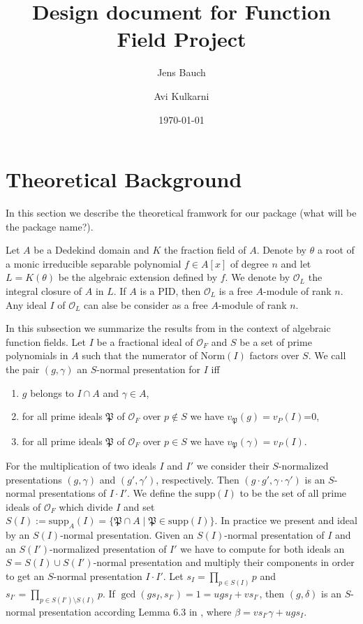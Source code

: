 \documentclass{amsart}
\title{Design document for Function Field Project}
\author{Jens Bauch}
\author{Avi Kulkarni}
\date{\today}
\theoremstyle{definition}
\def\P{\mathfrak{P}}
\def\su{\mathrm{supp}}
\def\oo{\mathcal{O}}
\def\NM{\mathrm{Norm}}
\begin{document}
	
\maketitle

\section{Theoretical Background}

In this section we describe the theoretical framwork for our package (what will be the package name?). 

Let $A$ be a Dedekind domain and $K$ the fraction field of $A$. Denote by $\theta$ a root of a monic irreducible separable polynomial $f\in A[x]$ of degree $n$ and let $L=K(\theta)$ be the algebraic extension defined by $f$. We denote by $\oo_L$ the integral closure of $A$ in $L$. If $A$ is a PID, then $\oo_L$ is a free $A$-module of rank $n$. Any ideal $I$ of $\oo_L$ can alse be consider as a free $A$-module of rank $n$.

In this subsection we summarize the results from \cite{Fieker} in the context of algebraic function fields. Let $I$ be a fractional ideal of $\oo_F$ and $S$ be a set of prime polynomials in $A$ such that the numerator of $\NM(I)$ factors over $S$. We call the pair $(g,\gamma)$ an $S$-normal presentation for $I$ iff
\begin{enumerate}
\item $g$ belongs to $I\cap A$ and $\gamma\in A$,
\item  for all prime ideals $\P$ of $\oo_F$ over $p\notin S$ we have $v_\P(g)=v_P(I)$=0,
\item  for all prime ideals $\P$ of $\oo_F$ over $p\in S$ we have $v_\P(\gamma)=v_P(I)$.
\end{enumerate}

For the multiplication of two ideals $I$ and $I'$ we consider their $S$-normalized presentations $(g,\gamma)$ and $(g',\gamma')$, respectively. Then $(g\cdot g',\gamma\cdot \gamma')$ is an $S$-normal presentations of $I\cdot I'$. We define the $\su(I)$ to be the set of all prime ideals of $\oo_F$ which divide $I$ and set $S(I):=\su_A(I) =\{\P\cap A\mid\P\in\su(I)\}$. In practice we present and ideal by an $S(I)$-normal presentation. Given an $S(I)$-normal presentation of $I$ and an $S(I')$-normalized presentation of $I'$ we have to compute for both ideals an $S=S(I)\cup S(I')$-normal presentation and multiply their components in order to get an $S$-normal presentation $I\cdot I'$. Let $s_I=\prod_{p\in S(I)}p$ and $s_{I'}=\prod_{p\in S(I')\setminus S(I)}p$. If $\gcd(g s_I,s_{I'})=1=ug s_I+vs_{I'}$, then $(g,\delta)$ is an $S$-normal presentation according Lemma 6.3 in \cite{Fieker}, where $\beta = vs_{I'}\gamma+ug s_I$.
\end{document}
